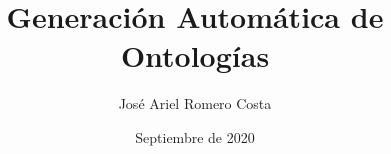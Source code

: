 \documentclass[12pt,twoside]{thesis}
\title{Generación Automática de Ontologías}
\author{José Ariel Romero Costa}
\date{Septiembre de 2020}
\begin{document}
	\let\cleardoublepage\clearpage

	\frontmatter
	\maketitle

	

	

	

	

	

	

	

	\mainmatter

	

	

	

	

	

	\backmatter

	

	

	
\end{document}

